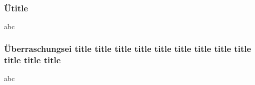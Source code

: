 \documentclass{beamer}
\begin{document}
    
\begin{frame}
\frametitle{Ütitle}
    abc 
\end{frame} 

\begin{frame}
\frametitle{Überraschungsei title title title title title title title title title title title title}
    abc
\end{frame} 
    
\end{document}
